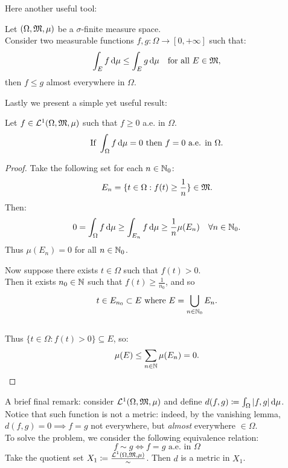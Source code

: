 Here another useful tool:
\begin{prop} \label{integral-inequality-sigma-finite}
	Let $(\Omega, \mathfrak M, \mu)$ be a $\sigma$-finite measure space.\\
	Consider two measurable functions $f,g: \Omega \to [0, +\infty]$ such that:
	$$
		\int_E f \, \mathrm d \mu \leq
		\int_E g \, \mathrm d \mu
		\quad \text{for all } E \in \mathfrak M
	,
	$$
	then $f\leq g$ almost everywhere in $\Omega$.
\end{prop}

Lastly we present a simple yet useful result:
\begin{theo}\label{vanishing-lemma}
	Let $f\in \mathcal L^1(\Omega, \mathfrak M, \mu)$ such that $f\geq 0$ a.e. in $\Omega$.
	$$
		\text{If }\int_\Omega f \,\mathrm d\mu = 0\text{ then }f = 0 \text{ a.e. in } \Omega.$$
\end{theo}
\begin{proof}
	Take the following set for each $n \in\mathbb N_0$:
	$$
		E_n 
		= \{t \in \Omega : f(t) \geq \frac 1 n \} \in \mathfrak M
	.
	$$
	Then:
	$$ 
		0 
		= \int_\Omega f \,\mathrm d\mu 
		\geq \int_{E_n} f \,\mathrm d\mu 
		\geq \frac 1 n \mu (E_n)
		\quad \forall n \in \mathbb N_0
	.
	$$
	Thus $\mu(E_n) = 0$ for all $n \in \mathbb N_0$.
	
	Now suppose there exists $t \in \Omega$  such that $f(t) > 0$.\\
	Then it exists $n_0 \in \mathbb N$ such that $f(t) \geq \frac 1 {n_0}$, and so
	$$t \in E_{n_0}\subset E \text{ where } E = \bigcup_{n\in \mathbb N_0} E_n.$$\\
	Thus $\{t\in \Omega : f(t) > 0\} \subseteq E$, so: 
	$$\mu (E) \le \sum_{n \in \mathbb N} \mu(E_n) = 0.$$
\end{proof}


A brief final remark: consider $\mathcal L^1(\Omega, \mathfrak M, \mu)$ and define $d(f,g) \coloneqq \int_\Omega |f,g| \,\mathrm d\mu$. Notice that such function is not a metric: indeed, by the vanishing lemma, $d(f,g)=0 \implies f=g$ not everywhere, but \textit{almost} everywhere $\in \Omega$.\\
To solve the problem, we consider the following equivalence relation: $$f \sim g \iff f=g \text{ a.e. in } \Omega$$
Take the quotient set $X_1 \coloneqq \frac{\mathcal L^1(\Omega, \mathfrak M, \mu)}{\sim}$. Then $d$ is a metric in $X_1$.

